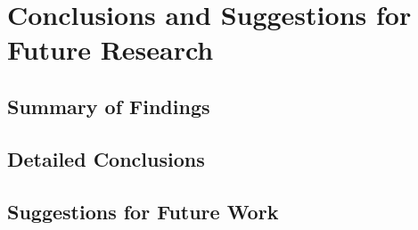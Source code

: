 \documentclass[11pt]{book}
\begin{document}
\chapter[Conclusions \& Future Research]{Conclusions and Suggestions for Future Research}
\label{conclude}

\section{Summary of Findings}

\section{Detailed Conclusions}

\section{Suggestions for Future Work}




 \markright{ }
\end{document}
